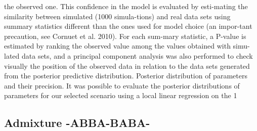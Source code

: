 the observed one. This confidence in the model is evaluated by esti-mating the similarity between simulated (1000 simula-tions) and real data sets using summary statistics different than the ones used for model choice (an impor-tant precaution, see Cornuet et al. 2010). For each sum-mary statistic, a P-value is estimated by ranking the observed value among the values obtained with simu-lated data sets, and a principal component analysis was also performed to check visually the position of the observed data in relation to the data sets generated from the posterior predictive distribution. Posterior distribution of parameters and their precision. It was possible to evaluate the posterior distributions of parameters for our selected scenario using a local linear regression on the 1%

\subsection{Admixture -ABBA-BABA-}

